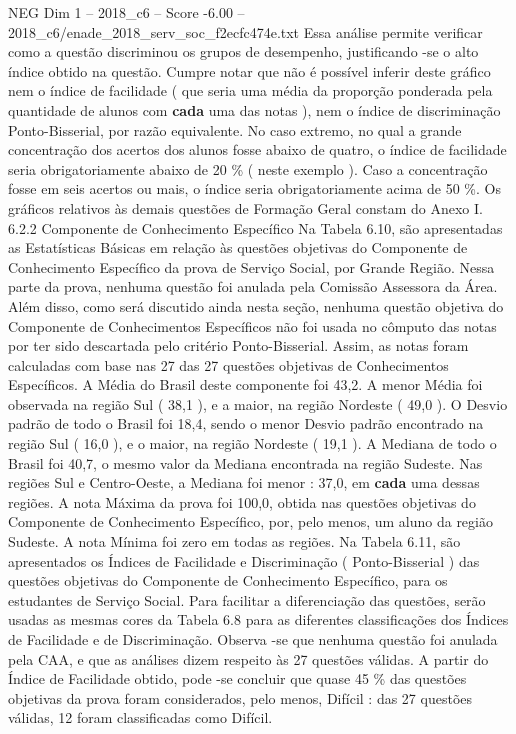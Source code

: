 \begin{textsample}{NEG Dim 1 – 2018\_c6 – Score -6.00 – 2018\_c6/enade\_2018\_serv\_soc\_f2ecfc474e.txt}
Essa análise permite verificar como a questão discriminou os grupos de desempenho, justificando -se o alto índice obtido na questão.
Cumpre notar que não é possível inferir deste gráfico nem o índice de facilidade ( que seria uma média da proporção ponderada pela quantidade de alunos com \textbf{cada} uma das notas ), nem o índice de discriminação Ponto-Bisserial, por razão equivalente.
No caso extremo, no qual a grande concentração dos acertos dos alunos fosse abaixo de quatro, o índice de facilidade seria obrigatoriamente abaixo de 20 \% ( neste exemplo ).
Caso a concentração fosse em seis acertos ou mais, o índice seria obrigatoriamente acima de 50 \%.
Os gráficos relativos às demais questões de Formação Geral constam do Anexo I. 6.2.2 Componente de Conhecimento Específico Na Tabela 6.10, são apresentadas as Estatísticas Básicas em relação às questões objetivas do Componente de Conhecimento Específico da prova de Serviço Social, por Grande Região.
Nessa parte da prova, nenhuma questão foi anulada pela Comissão Assessora da Área.
Além disso, como será discutido ainda nesta seção, nenhuma questão objetiva do Componente de Conhecimentos Específicos não foi usada no cômputo das notas por ter sido descartada pelo critério Ponto-Bisserial.
Assim, as notas foram calculadas com base nas 27 das 27 questões objetivas de Conhecimentos Específicos.
A Média do Brasil deste componente foi 43,2.
A menor Média foi observada na região Sul ( 38,1 ), e a maior, na região Nordeste ( 49,0 ).
O Desvio padrão de todo o Brasil foi 18,4, sendo o menor Desvio padrão encontrado na região Sul ( 16,0 ), e o maior, na região Nordeste ( 19,1 ).
A Mediana de todo o Brasil foi 40,7, o mesmo valor da Mediana encontrada na região Sudeste.
Nas regiões Sul e Centro-Oeste, a Mediana foi menor : 37,0, em \textbf{cada} uma dessas regiões.
A nota Máxima da prova foi 100,0, obtida nas questões objetivas do Componente de Conhecimento Específico, por, pelo menos, um aluno da região Sudeste.
A nota Mínima foi zero em todas as regiões.
Na Tabela 6.11, são apresentados os Índices de Facilidade e Discriminação ( Ponto-Bisserial ) das questões objetivas do Componente de Conhecimento Específico, para os estudantes de Serviço Social.
Para facilitar a diferenciação das questões, serão usadas as mesmas cores da Tabela 6.8 para as diferentes classificações dos Índices de Facilidade e de Discriminação.
Observa -se que nenhuma questão foi anulada pela CAA, e que as análises dizem respeito às 27 questões válidas.
A partir do Índice de Facilidade obtido, pode -se concluir que quase 45 \% das questões objetivas da prova foram considerados, pelo menos, Difícil : das 27 questões válidas, 12 foram classificadas como Difícil.

\end{textsample}
